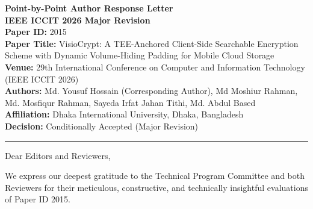\documentclass[11pt,a4paper]{article}
\begin{document}
\begin{center}
    {\LARGE \textbf{Point-by-Point Author Response Letter}}\\[1.5ex]
    {\large \textbf{IEEE ICCIT 2026 Major Revision}}\\[2ex]
    \textbf{Paper ID:} 2015\\[0.5ex]
    \textbf{Paper Title:} VisioCrypt: A TEE-Anchored Client-Side Searchable Encryption Scheme with Dynamic Volume-Hiding Padding for Mobile Cloud Storage\\[0.5ex]
    \textbf{Venue:} 29th International Conference on Computer and Information Technology (IEEE ICCIT 2026)\\[0.5ex]
    \textbf{Authors:} Md. Yousuf Hossain (Corresponding Author), Md Moshiur Rahman, Md. Mosfiqur Rahman, Sayeda Irfat Jahan Tithi, Md. Abdul Based\\[0.5ex]
    \textbf{Affiliation:} Dhaka International University, Dhaka, Bangladesh\\[0.5ex]
    \textbf{Decision:} Conditionally Accepted (Major Revision)
\end{center}

\vspace{1em}
\hrule
\vspace{1.5em}

\noindent Dear Editors and Reviewers,

\vspace{0.8em}
\noindent We express our deepest gratitude to the Technical Program Committee and both Reviewers for their meticulous, constructive, and technically insightful evaluations of Paper ID 2015. 
\end{document}
